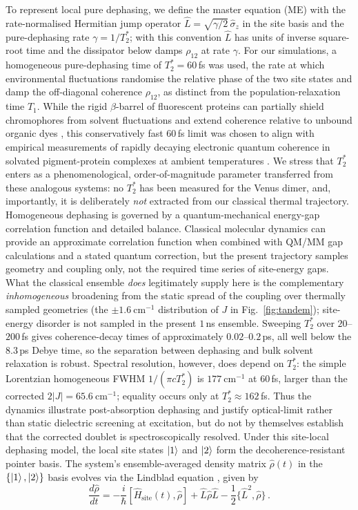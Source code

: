 \documentclass[journal=jpcbfk, manuscript=article, layout=twocolumn, doi=true]{achemso}
\begin{document}
To represent local pure dephasing, we define the master equation (ME) with the rate-normalised Hermitian jump operator $\hat{L} = \sqrt{\gamma/2}\,\hat{\sigma}_z$ in the site basis and the pure-dephasing rate $\gamma = 1/T_2^*$; with this convention $\hat L$ has units of inverse square-root time and the dissipator below damps $\rho_{12}$ at rate $\gamma$. For our simulations, a homogeneous pure-dephasing time of $T_2^* = 60$\,fs was used, the rate at which environmental fluctuations randomise the relative phase of the two site states and damp the off-diagonal coherence $\rho_{12}$, as distinct from the population-relaxation time $T_1$. While the rigid $\beta$-barrel of fluorescent proteins can partially shield chromophores from solvent fluctuations and extend coherence relative to unbound organic dyes \cite{kim2019venusa206}, this conservatively fast $60$\,fs limit was chosen to align with empirical measurements of rapidly decaying electronic quantum coherence in solvated pigment-protein complexes at ambient temperatures \cite{duan2017nature}. {We stress that $T_2^*$ enters as a phenomenological, order-of-magnitude parameter transferred from these analogous systems: no $T_2^*$ has been measured for the Venus dimer, and, importantly, it is deliberately \emph{not} extracted from our classical thermal trajectory. Homogeneous dephasing is governed by a quantum-mechanical energy-gap correlation function and detailed balance. Classical molecular dynamics can provide an approximate correlation function when combined with QM/MM gap calculations and a stated quantum correction, but the present trajectory samples geometry and coupling only, not the required time series of site-energy gaps. What the classical ensemble \emph{does} legitimately supply here is the complementary \emph{inhomogeneous} broadening from the static spread of the coupling over thermally sampled geometries (the $\pm 1.6~\mathrm{cm^{-1}}$ distribution of $J$ in Fig.~\ref{fig:tandem}); site-energy disorder is not sampled in the present $1$\,ns ensemble. Sweeping $T_2^*$ over $20$--$200$\,fs gives coherence-decay times of approximately $0.02$--$0.2$\,ps, all well below the $8.3$\,ps Debye time, so the separation between dephasing and bulk solvent relaxation is robust. Spectral resolution, however, does depend on $T_2^*$: the simple Lorentzian homogeneous FWHM $1/(\pi cT_2^*)$ is $177~\mathrm{cm^{-1}}$ at $60$\,fs, larger than the corrected $2|J|=65.6~\mathrm{cm^{-1}}$; equality occurs only at $T_2^*\approx162$\,fs. Thus the dynamics illustrate post-absorption dephasing and justify optical-limit rather than static dielectric screening at excitation, but do not by themselves establish that the corrected doublet is spectroscopically resolved.} Under this site-local dephasing model, the local site states $\ket{1}$ and $\ket{2}$ form the decoherence-resistant pointer basis. The system's ensemble-averaged density matrix $\hat{\rho}(t)$ in the $\{\ket{1},\ket{2}\}$ basis evolves via the Lindblad equation \cite{manzano2020short}, given by
\begin{equation}
    \frac{d\hat{\rho}}{dt}=-\frac{i}{\hbar}[\hat H_{\text{site}}(t),\hat\rho] + \hat{L} \hat\rho \hat{L} - \frac{1}{2} \{\hat{L}^2, \hat\rho\}\,.
    \label{eq:ME01}
\end{equation}
\end{document}
